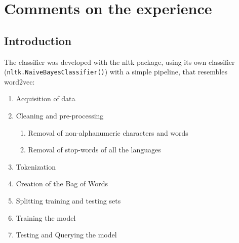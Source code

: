 \documentclass{article}
\begin{document}
    \section{Comments on the experience}
        \subsection{Introduction}
        The classifier was developed with the nltk package, using its own classifier (\texttt{nltk.NaiveBayesClassifier()}) with a simple pipeline, that resembles word2vec:
            \begin{enumerate}
                \item Acquisition of data
                \item Cleaning and pre-processing 
                    \begin{enumerate}
                        \item Removal of non-alphanumeric characters and words 
                        \item Removal of stop-words of all the languages
                    \end{enumerate}
                \item Tokenization 
                \item Creation of the Bag of Words 
                \item Splitting training and testing sets 
                \item Training the model 
                \item Testing and Querying the model
            \end{enumerate}
\end{document}
